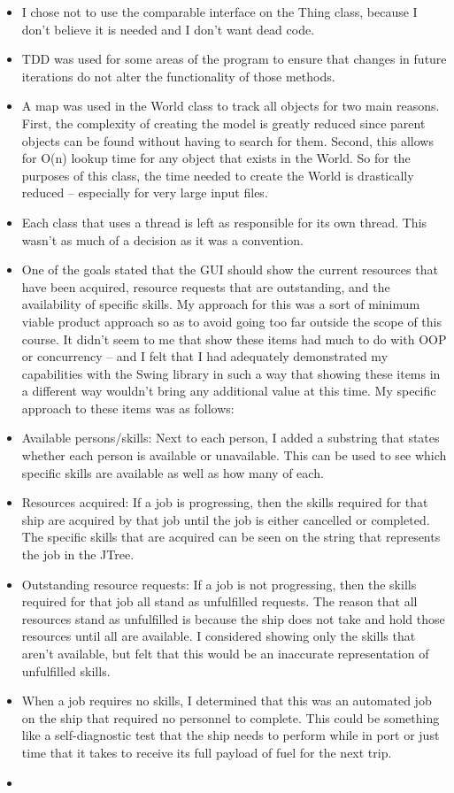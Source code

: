 \documentclass[english,floatsintext,man]{apa6}
\begin{document}
\begin{itemize}
\item
  I chose not to use the comparable interface on the Thing class,
  because I don't believe it is needed and I don't want dead code.
\item
  TDD was used for some areas of the program to ensure that changes in
  future iterations do not alter the functionality of those methods.
\item
  A map was used in the World class to track all objects for two main
  reasons. First, the complexity of creating the model is greatly
  reduced since parent objects can be found without having to search for
  them. Second, this allows for O(n) lookup time for any object that
  exists in the World. So for the purposes of this class, the time
  needed to create the World is drastically reduced -- especially for
  very large input files.
\item
  Each class that uses a thread is left as responsible for its own
  thread. This wasn't as much of a decision as it was a convention.
\item
  One of the goals stated that the GUI should show the current resources
  that have been acquired, resource requests that are outstanding, and
  the availability of specific skills. My approach for this was a sort
  of minimum viable product approach so as to avoid going too far
  outside the scope of this course. It didn't seem to me that show these
  items had much to do with OOP or concurrency -- and I felt that I had
  adequately demonstrated my capabilities with the Swing library in such
  a way that showing these items in a different way wouldn't bring any
  additional value at this time. My specific approach to these items was
  as follows:
\item
  Available persons/skills: Next to each person, I added a substring
  that states whether each person is available or unavailable. This can
  be used to see which specific skills are available as well as how many
  of each.
\item
  Resources acquired: If a job is progressing, then the skills required
  for that ship are acquired by that job until the job is either
  cancelled or completed. The specific skills that are acquired can be
  seen on the string that represents the job in the JTree.
\item
  Outstanding resource requests: If a job is not progressing, then the
  skills required for that job all stand as unfulfilled requests. The
  reason that all resources stand as unfulfilled is because the ship
  does not take and hold those resources until all are available. I
  considered showing only the skills that aren't available, but felt
  that this would be an inaccurate representation of unfulfilled skills.
\item
  When a job requires no skills, I determined that this was an automated
  job on the ship that required no personnel to complete. This could be
  something like a self-diagnostic test that the ship needs to perform
  while in port or just time that it takes to receive its full payload
  of fuel for the next trip.
\item ~

\end{itemize}
\end{document}
